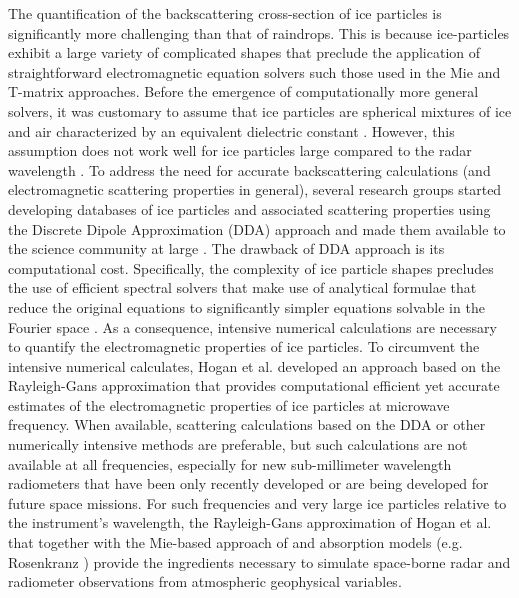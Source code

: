 \documentclass[10pt]{ietbook}
\begin{document}
The quantification of the backscattering cross-section of ice particles is significantly more challenging than that of raindrops.
This is because ice-particles exhibit a large variety of complicated shapes that preclude the application of straightforward 
electromagnetic equation solvers such those used in the Mie and T-matrix approaches.
Before the emergence of computationally more general solvers, it was customary to assume that ice particles are spherical mixtures
of ice and air characterized by an equivalent dielectric constant \cite{battan1973}.  However, this assumption does not work well for
ice particles large compared to the radar wavelength \cite{tyynela2011,liu2004,kuo2016}. To address the need for accurate backscattering
calculations (and electromagnetic scattering properties in general), several research groups started developing databases of ice particles
and associated scattering properties using the Discrete Dipole Approximation (DDA) approach \cite{dda1994} 
and made them available to the science community at large \cite{liu2004,kuo2016}.  The drawback of DDA approach is its computational
cost. Specifically, the complexity of ice particle shapes precludes the use of efficient spectral solvers that make use of analytical formulae
that reduce the original equations to significantly simpler equations solvable in the Fourier space \cite{spectral_matlab}.  As a consequence, 
intensive numerical
calculations are necessary to quantify the electromagnetic properties of ice particles.  To circumvent the intensive numerical calculates, 
Hogan et al. \cite{hogan2017} developed an approach based on the Rayleigh-Gans approximation that provides computational efficient yet
accurate estimates of the electromagnetic properties of ice particles at microwave frequency.  When available, 
scattering calculations based on the DDA or other numerically intensive methods are preferable, but such calculations are not available at 
all frequencies, especially for new sub-millimeter wavelength radiometers that have been only recently developed or are being developed for
future space missions.  For such frequencies and very large ice particles relative to the instrument's wavelength,  the Rayleigh-Gans 
approximation of Hogan et al. \cite{hogan2017}  that together with the Mie-based approach of \cite{bhmie2008} and absorption models (e.g.
Rosenkranz \cite{rosenkranz1998}) provide the ingredients necessary to simulate space-borne radar and radiometer observations from 
atmospheric geophysical variables.
\end{document}
